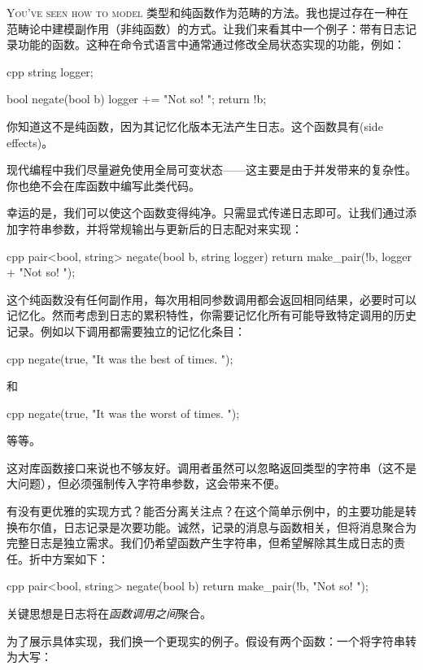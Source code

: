 
\lettrine[lhang=0.17]{Y}{ou've seen how to model} 类型和纯函数作为范畴的方法。我也提过存在一种在范畴论中建模副作用（非纯函数）的方式。让我们来看其中一个例子：带有日志记录功能的函数。这种在命令式语言中通常通过修改全局状态实现的功能，例如：

\begin{snip}{cpp}
string logger;

bool negate(bool b) {
    logger += "Not so! ";
    return !b;
}
\end{snip}
你知道这不是纯函数，因为其记忆化版本无法产生日志。这个函数具有(side effects)。

现代编程中我们尽量避免使用全局可变状态——这主要是由于并发带来的复杂性。你也绝不会在库函数中编写此类代码。

幸运的是，我们可以使这个函数变得纯净。只需显式传递日志即可。让我们通过添加字符串参数，并将常规输出与更新后的日志配对来实现：

\begin{snip}{cpp}
pair<bool, string> negate(bool b, string logger) {
    return make_pair(!b, logger + "Not so! ");
}
\end{snip}
这个纯函数没有任何副作用，每次用相同参数调用都会返回相同结果，必要时可以记忆化。然而考虑到日志的累积特性，你需要记忆化所有可能导致特定调用的历史记录。例如以下调用都需要独立的记忆化条目：

\begin{snip}{cpp}
negate(true, "It was the best of times. ");
\end{snip}
和

\begin{snip}{cpp}
negate(true, "It was the worst of times. ");
\end{snip}
等等。

这对库函数接口来说也不够友好。调用者虽然可以忽略返回类型的字符串（这不是大问题），但必须强制传入字符串参数，这会带来不便。

有没有更优雅的实现方式？能否分离关注点？在这个简单示例中，的主要功能是转换布尔值，日志记录是次要功能。诚然，记录的消息与函数相关，但将消息聚合为完整日志是独立需求。我们仍希望函数产生字符串，但希望解除其生成日志的责任。折中方案如下：

\begin{snip}{cpp}
pair<bool, string> negate(bool b) {
    return make_pair(!b, "Not so! ");
}
\end{snip}
关键思想是日志将在\emph{函数调用之间}聚合。

为了展示具体实现，我们换一个更现实的例子。假设有两个函数：一个将字符串转为大写：

